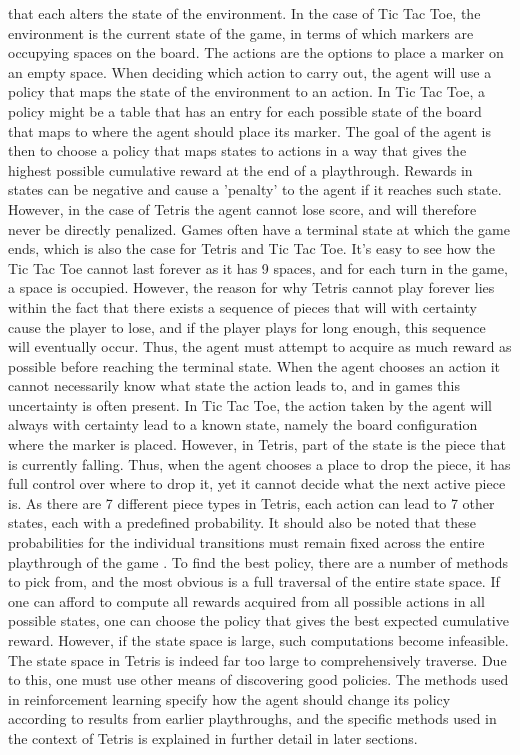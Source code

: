 that each alters the state of the environment. In the case of 
Tic Tac Toe, the environment is the current state of the game, 
in terms of which markers are occupying spaces on the board.
The actions are the options to place a marker
on an empty space.
When deciding which action to carry out, the agent will use
a policy that maps the state of the environment to an action.
In Tic Tac Toe, a policy might be a table that has an entry for each possible
state of the board that maps to where the agent should place its marker.
The goal of the agent is then to choose a policy that maps states to actions 
in a way that
gives the highest possible cumulative reward at the end of a playthrough. 
Rewards in states can be negative and cause a 'penalty' to the agent if it reaches
such state. However, in the case of Tetris the agent cannot lose score,
and will therefore never be directly  penalized.
Games often have a terminal state at which the game ends, which is 
also the case for Tetris and Tic Tac Toe. It's easy to see how the
Tic Tac Toe cannot last forever as it has 9 spaces, and for each turn in the game,
a space is occupied. However, the reason for why Tetris cannot play forever
lies within the fact that there exists a sequence of pieces that will
with certainty cause the player to lose, and if the player plays for 
long enough, this sequence will eventually occur. Thus, the agent must
attempt to acquire as much reward as possible before reaching the terminal 
state. 
When the agent chooses an action it cannot necessarily know what state
the action leads to, and in games this uncertainty is often present.
In Tic Tac Toe, the action taken by the agent will always with certainty 
lead to a known state, namely the board configuration where the marker is placed.
However, in Tetris, part of the state is the piece that is currently falling.
Thus, when the agent chooses a place to drop the piece, it has full control
over where to drop it, yet it cannot decide what the next active piece is.
As there are 7 different piece
types in Tetris, each action can lead to 7 other states, each with a predefined probability.
It should also be noted that these probabilities for the individual transitions
must remain fixed across the entire playthrough of the game \citep{Carr}.
To find the best policy, there are a number of methods to pick from,
and the most obvious is a full traversal of the entire state space.
If one can afford to compute all rewards acquired from all possible 
actions in all possible states, one can choose the policy 
that gives the best expected cumulative reward. However, if the state space is
large, such computations become infeasible. The state space in Tetris
is indeed far too large to comprehensively traverse.
Due to this, one must use other means of discovering good policies.
The methods used in reinforcement learning 
specify how the agent should change its policy according to 
results from earlier playthroughs, and the specific methods used in
the context of Tetris is explained in further detail in later sections.


